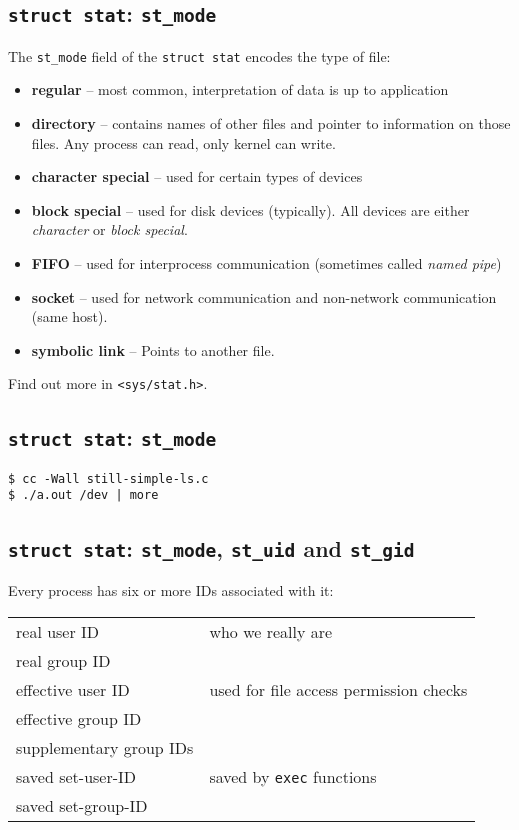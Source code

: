 \documentclass[xga]{xdvislides}
\begin{document}
\subsection{{\tt struct stat}: {\tt st\_mode}}

The {\tt st\_mode} field of the {\tt struct stat} encodes the type of file:

\begin{itemize}
	\item {\bf regular} -- most common, interpretation of data is up to
		application
	\item {\bf directory} -- contains names of other files and pointer to
		information on those files. Any process can read, only kernel
		can write.
	\item {\bf character special} -- used for certain types of devices
	\item {\bf block special} -- used for disk devices (typically). All
		devices are either {\em character} or {\em block special}.
	\item {\bf FIFO} -- used for interprocess communication
		(sometimes called {\em named pipe})
	\item {\bf socket} -- used for network communication and non-network
		communication (same host).
	\item {\bf symbolic link} -- Points to another file.
\end{itemize}
\vspace{.25in}
Find out more in {\tt <sys/stat.h>}.

\subsection{{\tt struct stat}: {\tt st\_mode}}
\begin{verbatim}
$ cc -Wall still-simple-ls.c
$ ./a.out /dev | more
\end{verbatim}

\subsection{{\tt struct stat}: {\tt st\_mode}, {\tt st\_uid} and {\tt st\_gid}}
Every process has six or more IDs associated with it:
\\

\begin{tabular}{| l | l |}
	\hline
	real user ID & who we really are \\
	real group ID & \\
	\hline
	effective user ID & used for file access permission checks \\
	effective group ID & \\
	supplementary group IDs & \\
	\hline
	saved set-user-ID & saved by {\tt exec} functions \\
	saved set-group-ID & \\
	\hline
\end{tabular}
\vspace{.25in}
\end{document}
